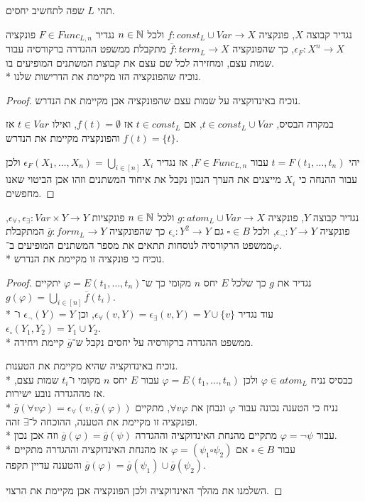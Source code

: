 \question{}
תהי $L$ שפה לתחשיב יחסים.

\subquestion{}
נגדיר קבוצה $X$, פונקציה $f : const_L \cup Var \to X$ ולכל $n \in \mathbb{N}$ נגדיר $F \in Func_{L, n}$ פונקציה $\epsilon_F : X^n \to X$,
כך שהפונקציה $\overline{f} : term_L \to X$ מתקבלת ממשפט ההגדרה ברקורסיה עבור שמות עצם, ומחזירה לכל שם עצם את קבוצת המשתנים המופיעים בו. \\*
נוכיח שהפונקציה הזו מקיימת את הדרישות שלנו.
\begin{proof}
	נוכיח באינדוקציה על שמות עצם שהפונקציה אכן מקיימת את הנדרש.

	במקרה הבסיס, $t \in const_L \cup Var$, אם $t \in const_L$ אז $f(t) = \emptyset$, ואילו $t \in Var$ אז $f(t) = \{ t \}$ והפונקציה מקיימת את הנדרש.

	יהי $t = F(t_1, \dots, t_n)$ עבור $F \in Func_{L, n}$, אז נגדיר $\epsilon_F(X_1, \dots, X_n) = \bigcup_{i \in [n]} X_i$ ולכן עבור ההנחה כי $X_i$ מייצגים את הערך הנכון נקבל את איחוד המשתנים וזהו אכן הביטוי שאנו מחפשים.
\end{proof}

\subquestion{}
נגדיר קבוצה $Y$, פונקציה $g : atom_L \cup Var \to X$ ולכל $n \in \mathbb{N}$ פונקציות $\epsilon_\forall, \epsilon_\exists : Var \times Y \to Y$, פונקציה $\epsilon_\lnot : Y \to Y$,
ולכל $\square \in B$ גם $\epsilon_\square : Y^2 \to Y$ כך שהפונקציה $\overline{g} : form_L \to Y$ המתקבלת ממשפט הרקורסיה לנוסחות תתאים את מספר המשתנים המופיעים ב־$\varphi$. \\*
נוכיח כי פונקציה זו מקיימת את הנדרש.
\begin{proof}
	נגדיר את $g$ כך שלכל $E$ יחס $n$ מקומי כך ש־$\varphi = E(t_1, \dots, t_n)$ יתקיים $g(\varphi) = \bigcup_{i \in [n]} \overline{f}(t_i)$. \\*
	עוד נגדיר $\epsilon_\forall(v, Y) = \epsilon_\exists(v, Y) = Y \cup \{v\}$, וכן $\epsilon_\lnot(Y) = Y$ ו־$\epsilon_\square(Y_1, Y_2) = Y_1 \cup Y_2$. \\*
	ממשפט ההגדרה ברקורסיה על יחסים נקבל ש־$\overline{g}$ קיימת ויחידה.

	נוכיח באינדוקציה שהיא מקיימת את הטענות. \\*
	כבסיס נניח $\varphi \in atom_L$ ולכן $\varphi = E(t_1, \dots, t_n)$ עבור $E$ יחס $n$ מקומי ו־$t_i$ שמות עצם, אז מההגדרה נובע ישירות. \\*
	נניח כי הטענה נכונה עבור $\varphi$ ונבחן את $\forall v \varphi$, מתקיים $\overline{g}(\forall v \varphi) = \epsilon_\forall(v, \overline{g}(\varphi))$ ופונקציה זו מקיימת את הטענה, ההוכחה ל־$\exists$ זהה. \\*
	עבור $\varphi = \lnot \psi$ מתקיים מהנחת האינדוקציה וההגדרה $\overline{g}(\varphi) = \overline{g}(\psi)$ וזה אכן נכון. \\*
	עבור $\square \in B$ אם $\varphi = (\psi_1 \square \psi_2)$ אז מהנחת האינדוקציה וההגדרה מתקיים $\overline{g}(\varphi) = \overline{g}(\psi_1) \cup \overline{g}(\psi_2)$ והטענה עדיין תקפה.

	השלמנו את מהלך האינדוקציה ולכן הפונקציה אכן מקיימת את הרצוי.
\end{proof}

